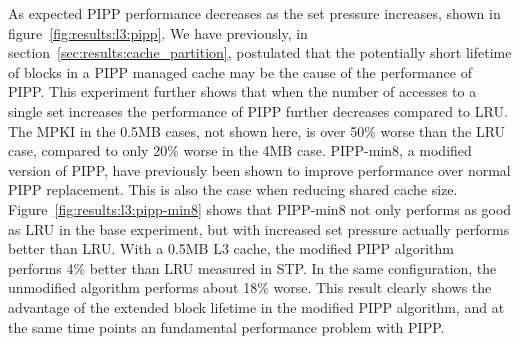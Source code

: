 As expected PIPP performance decreases as the set pressure increases, shown in figure~\ref{fig:results:l3:pipp}.
We have previously, in section~\ref{sec:results:cache_partition}, postulated that the potentially short lifetime of blocks in a PIPP managed cache may be the cause of the performance of PIPP.
This experiment further shows that when the number of accesses to a single set increases the performance of PIPP further decreases compared to LRU.
The MPKI in the 0.5MB cases, not shown here, is over 50\% worse than the LRU case, compared to only 20\% worse in the 4MB case.
PIPP-min8, a modified version of PIPP, have previously been shown to improve performance over normal PIPP replacement.
This is also the case when reducing shared cache size.
Figure~\ref{fig:results:l3:pipp-min8} shows that PIPP-min8 not only performs as good as LRU in the base experiment, but with increased set pressure actually performs better than LRU.
With a 0.5MB L3 cache, the modified PIPP algorithm performs 4\% better than LRU measured in STP.
In the same configuration, the unmodified algorithm performs about 18\% worse.
This result clearly shows the advantage of the extended block lifetime in the modified PIPP algorithm, and at the same time points an fundamental performance problem with PIPP.

